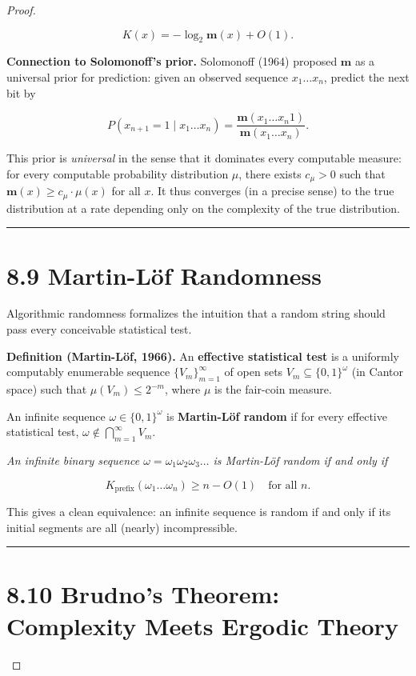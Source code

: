 \begin{proof}
\begin{theorem}
\[
K(x) = -\log_2 \mathbf{m}(x) + O(1).
\]

\textbf{Connection to Solomonoff's prior.} Solomonoff (1964) proposed $\mathbf{m}$ as a universal prior for prediction: given an observed sequence $x_1 \ldots x_n$, predict the next bit by

\[
P(x_{n+1} = 1 \mid x_1 \ldots x_n) = \frac{\mathbf{m}(x_1 \ldots x_n 1)}{\mathbf{m}(x_1 \ldots x_n)}.
\]

This prior is \textit{universal} in the sense that it dominates every computable measure: for every computable probability distribution $\mu$, there exists $c_\mu > 0$ such that $\mathbf{m}(x) \geq c_\mu \cdot \mu(x)$ for all $x$. It thus converges (in a precise sense) to the true distribution at a rate depending only on the complexity of the true distribution.

\bigskip\hrule\bigskip
\end{theorem}

\section{8.9 Martin-Löf Randomness}

Algorithmic randomness formalizes the intuition that a random string should pass every conceivable statistical test.

\textbf{Definition (Martin-Löf, 1966).} An \textbf{effective statistical test} is a uniformly computably enumerable sequence $\{ V_m\} _{m=1}^{\infty}$ of open sets $V_m \subseteq \{ 0,1\} ^\omega$ (in Cantor space) such that $\mu(V_m) \leq 2^{-m}$, where $\mu$ is the fair-coin measure.

An infinite sequence $\omega \in \{ 0,1\} ^\omega$ is \textbf{Martin-Löf random} if for every effective statistical test, $\omega \notin \bigcap_{m=1}^{\infty} V_m$.

\begin{theorem}
\textit{An infinite binary sequence $\omega = \omega_1 \omega_2 \omega_3 \ldots$ is Martin-Löf random if and only if}

\[
K_{\text{prefix}}(\omega_1 \ldots \omega_n) \geq n - O(1) \quad \text{for all } n.
\]

This gives a clean equivalence: an infinite sequence is random if and only if its initial segments are all (nearly) incompressible.

\bigskip\hrule\bigskip
\end{theorem}

\section{8.10 Brudno's Theorem: Complexity Meets Ergodic Theory}


\end{proof}
